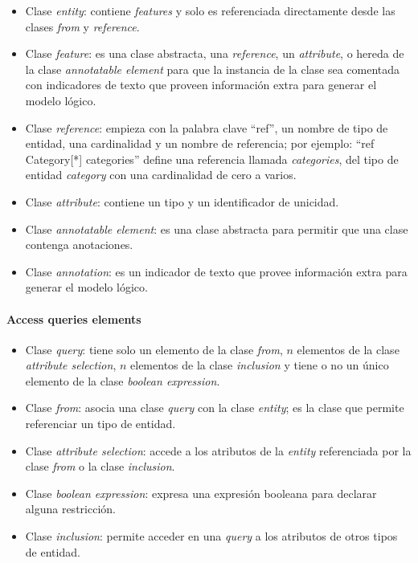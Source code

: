 \begin{itemize}    
    
    \item Clase \textit{entity}: contiene \textit{features} y solo es referenciada directamente desde las clases \textit{from} y \textit{reference}.
    \item Clase \textit{feature}: es una clase abstracta, una \textit{reference}, un \textit{attribute}, o hereda de la clase \textit{annotatable element} para que la instancia de la clase sea comentada con indicadores de texto que proveen información extra para generar el modelo lógico. 
    \item Clase \textit{reference}: empieza con la palabra clave ``ref'', un nombre de tipo de entidad, una cardinalidad y un nombre de referencia; por ejemplo: ``ref Category[*] categories'' define una referencia llamada \textit{categories}, del tipo de entidad \textit{category} con una cardinalidad de cero a varios.
    \item Clase \textit{attribute}: contiene un tipo y un identificador de unicidad.
    \item Clase \textit{annotatable element}: es una clase abstracta para permitir que una clase contenga anotaciones.
    \item Clase \textit{annotation}: es un indicador de texto que provee información extra para generar el modelo lógico.
    
\end{itemize}

\paragraph*{Access queries elements}


\begin{itemize}
    
    \item Clase \textit{query}: tiene solo un elemento de la clase \textit{from}, $n$ elementos de la clase \textit{attribute selection}, $n$ elementos de la clase \textit{inclusion} y tiene o no un único elemento de la clase \textit{boolean expression}.
    \item Clase \textit{from}: asocia una clase \textit{query} con la clase \textit{entity}; es la clase que permite referenciar un tipo de entidad.
    \item Clase \textit{attribute selection}: accede a los atributos de la \textit{entity} referenciada por la clase \textit{from} o la clase \textit{inclusion}.
    \item Clase \textit{boolean expression}: expresa una expresión booleana para declarar alguna restricción.
    \item Clase \textit{inclusion}: permite acceder en una \textit{query} a los atributos de otros tipos de entidad.
    
\end{itemize}

